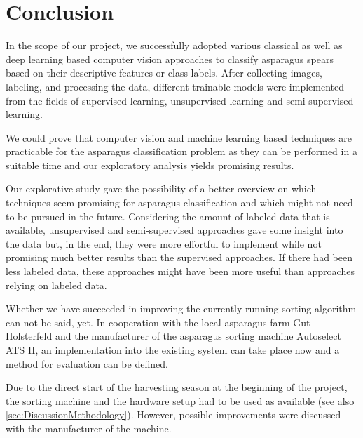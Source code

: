 \section{Conclusion}
\label{ch:Conclusion}

In the scope of our project, we successfully adopted various classical as well as deep learning based computer vision approaches to classify asparagus spears based on their descriptive features or class labels. After collecting images, labeling, and processing the data, different trainable models were implemented from the fields of supervised learning, unsupervised learning and semi-supervised learning.

\bigskip
We could prove that computer vision and machine learning based techniques are practicable for the asparagus classification problem as they can be performed in a suitable time and our exploratory analysis yields promising results.

Our explorative study gave the possibility of a better overview on which techniques seem promising for asparagus classification and which might not need to be pursued in the future. Considering the amount of labeled data that is available, unsupervised and semi-supervised approaches gave some insight into the data but, in the end, they were more effortful to implement while not promising much better results than the supervised approaches. If there had been less labeled data, these approaches might have been more useful than approaches relying on labeled data.

Whether we have succeeded in improving the currently running sorting algorithm can not be said, yet. In cooperation with the local asparagus farm Gut Holsterfeld and the manufacturer of the asparagus sorting machine Autoselect ATS II, an implementation into the existing system can take place now and a method for evaluation can be defined.


\bigskip
Due to the direct start of the harvesting season at the beginning of the project, the sorting machine and the hardware setup had to be used as available (see also \autoref{sec:DiscussionMethodology}). However, possible improvements were discussed with the manufacturer of the machine.

